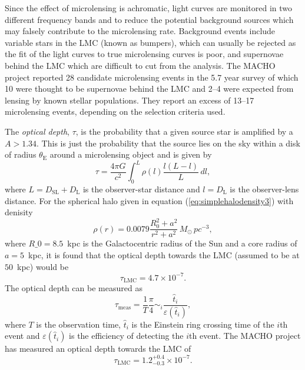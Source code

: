 Since the effect of microlensing is achromatic, light curves are monitored in
two different frequency bands and to reduce the potential background sources
which may falsely contribute to the microlensing rate. Background events
include variable stars in the LMC (known as bumpers\cite{1996astro.ph..6165A}), 
which can usually be rejected as the fit of the light curves to true
microlensing curves is poor, and supernovae behind the LMC which are difficult
to cut from the analysis. The MACHO project reported 28 candidate microlensing
events in the 5.7 year survey of which 10 were thought to be supernovae
behind the LMC and 2--4 were expected from lensing by known stellar
populations.  They report an excess of 13--17 microlensing events, depending
on the selection criteria used.

The \emph{optical depth}, $\tau$, is the probability that a given source star
is amplified by a $A > 1.34$. This is just the probability that the source
lies on the sky within a disk of radius $\theta_\mathrm{E}$ around a
microlensing object and is given by\cite{Alcock:1995zx}
\begin{equation}
\tau = \frac{4\pi G}{c^2} \int_0^{L} \rho(l) \frac{l(L - l)}{L}\,dl,
\end{equation}
where $L = D_\mathrm{SL} + D_\mathrm{L}$ is the observer-star distance and $l
= D_\mathrm{L}$ is the observer-lens distance. For the spherical halo given in
equation (\ref{eq:simplehalodensity3}) with denisity
\begin{equation}
\rho(r) = 0.0079 \frac{R_0^2 + a^2}{r^2 + a^2} \,M_\odot\, pc^{-3},
\end{equation}
where $R\_0 = 8.5$~kpc is the Galactocentric radius of the Sun and a core
radius of $a = 5$~kpc, it is found that the optical depth towards the LMC
(assumed to be at $50$~kpc) would be
\begin{equation}
\tau_\mathrm{LMC} = 4.7 \times 10^{-7}.
\end{equation}
The optical depth can be measured as
\begin{equation}
\tau_\mathrm{meas} = \frac{1}{T} \frac{\pi}{4} \sim_{i}
\frac{\hat{t}_i}{\varepsilon(\hat{t}_i)},
\end{equation}
where $T$ is the observation time, $\hat{t}_i$ is the Einstein ring crossing
time of the $i$th event and $\varepsilon(\hat{t}_i)$ is the efficiency of
detecting the $i$th event.  The MACHO project has measured an optical depth
towards the LMC of 
\begin{equation}
\tau_\mathrm{LMC} = 1.2_{-0.3}^{+0.4} \times 10^{-7}.
\end{equation}

